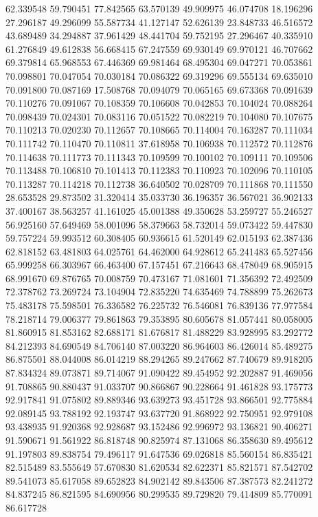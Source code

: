 62.339548
59.790451
77.842565
63.570139
49.909975
46.074708
18.196296
27.296187
49.296099
55.587734
41.127147
52.626139
23.848733
46.516572
43.689489
34.294887
37.961429
48.441704
59.752195
27.296467
40.335910
61.276849
49.612838
56.668415
67.247559
69.930149
69.970121
46.707662
69.379814
65.968553
67.446369
69.981464
68.495304
69.047271
70.053861
70.098801
70.047054
70.030184
70.086322
69.319296
69.555134
69.635010
70.091800
70.087169
17.508768
70.094079
70.065165
69.673368
70.091639
70.110276
70.091067
70.108359
70.106608
70.042853
70.104024
70.088264
70.098439
70.024301
70.083116
70.051522
70.082219
70.104080
70.107675
70.110213
70.020230
70.112657
70.108665
70.114004
70.163287
70.111034
70.111742
70.110470
70.110811
37.618958
70.106938
70.112572
70.112876
70.114638
70.111773
70.111343
70.109599
70.100102
70.109111
70.109506
70.113488
70.106810
70.101413
70.112383
70.110923
70.102096
70.110105
70.113287
70.114218
70.112738
36.640502
70.028709
70.111868
70.111550
28.653528
29.873502
31.320414
35.033730
36.196357
36.567021
36.902133
37.400167
38.563257
41.161025
45.001388
49.350628
53.259727
55.246527
56.925160
57.649469
58.001096
58.379663
58.732014
59.073422
59.447830
59.757224
59.993512
60.308405
60.936615
61.520149
62.015193
62.387436
62.818152
63.481803
64.025761
64.462000
64.928612
65.241483
65.527456
65.999258
66.303967
66.463400
67.157451
67.216643
68.478049
68.905915
68.991670
69.876765
70.008759
70.473167
71.081601
71.356392
72.492509
72.378762
73.269724
73.104904
72.835220
74.635469
74.788899
75.262673
75.483178
75.598501
76.336582
76.225732
76.546081
76.839136
77.977584
78.218714
79.006377
79.861863
79.353895
80.605678
81.057441
80.058005
81.860915
81.853162
82.688171
81.676817
81.488229
83.928995
83.292772
84.212393
84.690549
84.706140
87.003220
86.964603
86.426014
85.489275
86.875501
88.044008
86.014219
88.294265
89.247662
87.740679
89.918205
87.834324
89.073871
89.714067
91.090422
89.454952
92.202887
91.469056
91.708865
90.880437
91.033707
90.866867
90.228664
91.461828
93.175773
92.917841
91.075802
89.889346
93.639273
93.451728
93.866501
92.775884
92.089145
93.788192
92.193747
93.637720
91.868922
92.750951
92.979108
93.438935
91.920368
92.928687
93.152486
92.996972
93.136821
90.406271
91.590671
91.561922
86.818748
90.825974
87.131068
86.358630
89.495612
91.197803
89.838754
79.496117
91.647536
69.026818
85.560154
86.835421
82.515489
83.555649
57.670830
81.620534
82.622371
85.821571
87.542702
89.541073
85.617058
89.652823
84.902142
89.843506
87.387573
82.241272
84.837245
86.821595
84.690956
80.299535
89.729820
79.414809
85.770091
86.617728
